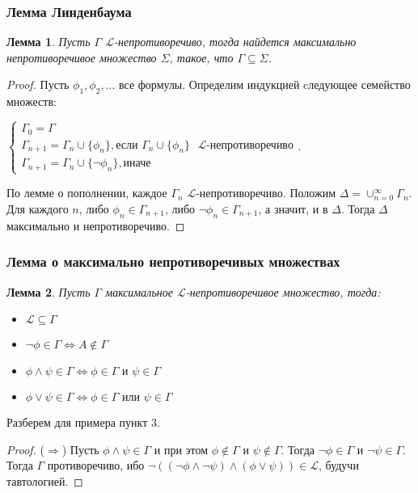 \documentclass[pdf,utf8,russian,aspectratio=169]{beamer}
\newtheorem{lem}{Лемма}
\begin{document}
\begin{frame}
  \frametitle{Лемма Линденбаума}

  \begin{lem}
    Пусть $\Gamma$ $\mathcal{L}$-непротиворечиво, тогда найдется максимально непротиворечивое множество $\Sigma$, такое, что $\Gamma \subseteq \Sigma$.
  \end{lem}

  \begin{proof}
    Пусть $\phi_1, \phi_2, \dots$ все формулы. Определим индукцией cледующее семейство множеств:

    $\begin{cases} \Gamma_0 = \Gamma \\ \Gamma_{n + 1} = \Gamma_{n} \cup \{ \phi_{n}\}, \text{если $\Gamma_{n} \cup \{ \phi_{n}\}$ $\mathcal{L}$-непротиворечиво}
    \\ \Gamma_{n + 1} = \Gamma_{n} \cup \{ \neg \phi_{n}\}, \text{иначе} \end{cases}$.

    По лемме о пополнении, каждое $\Gamma_{n}$ $\mathcal{L}$-непротиворечиво. Положим $\Delta = \cup_{n = 0}^{\infty} \Gamma_n$.
    Для каждого $n$, либо $\phi_n \in \Gamma_{n + 1}$, либо $\neg \phi_n \in \Gamma_{n + 1}$, а значит, и в $\Delta$. Тогда $\Delta$ максимально и непротиворечиво.
  \end{proof}
\end{frame}

\begin{frame}
  \frametitle{Лемма о максимально непротиворечивых множествах}

  \begin{lem}
    Пусть $\Gamma$ максимальное $\mathcal{L}$-непротиворечивое множество, тогда:
    \begin{itemize}
      \item $\mathcal{L} \subseteq \Gamma$
      \item $\neg \phi \in \Gamma \Leftrightarrow A \notin \Gamma$
      \item $\phi \land \psi \in \Gamma \Leftrightarrow \phi \in \Gamma \text{ и } \psi \in \Gamma$
      \item $\phi \lor \psi \in \Gamma \Leftrightarrow \phi \in \Gamma \text{ или } \psi \in \Gamma$
    \end{itemize}
  \end{lem}
    Разберем для примера пункт 3.
  \begin{proof}
    ($\Rightarrow$) Пусть $\phi \land \psi \in \Gamma$ и при этом $\phi \notin \Gamma$ и $\psi \notin \Gamma$. Тогда $\neg \phi \in \Gamma$ и $\neg \psi \in \Gamma$.
    Тогда $\Gamma$ противоречиво, ибо $\neg ((\neg \phi \land \neg \psi) \land (\phi \lor \psi)) \in \mathcal{L}$, будучи тавтологией.
  \end{proof}
\end{frame}
\end{document}
